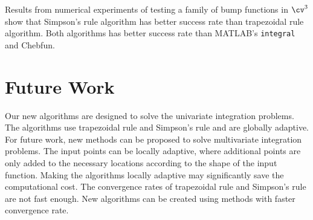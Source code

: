 \documentclass{iitthesis}
\theoremstyle{definition}
\theoremstyle{remark}
\begin{document}
Results from numerical experiments of testing a family of bump functions in $\cv^3$ show that Simpson's rule algorithm has better success rate than trapezoidal rule algorithm. Both algorithms has better success rate than MATLAB's {\tt integral} and Chebfun.

\section{Future Work}
Our new algorithms are designed to solve the univariate integration problems. The algorithms use trapezoidal rule and Simpson's rule and are globally adaptive. For future work, new methods can be proposed to solve multivariate integration problems. The input points can be locally adaptive, where additional points are only added to the necessary locations according to the shape of the input function. Making the algorithms locally adaptive may significantly save the computational cost. The convergence rates of trapezoidal rule and Simpson's rule are not fast enough. New algorithms can be created using methods with faster convergence rate.



\clearpage


%
%
%
%
%
%
%
%
%
%
%
%

%


\end{document}
